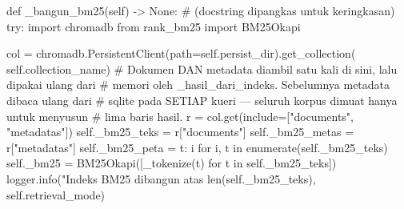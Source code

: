 def _bangun_bm25(self) -> None:
    # (docstring dipangkas untuk keringkasan)
    try:
        import chromadb
        from rank_bm25 import BM25Okapi

        col = chromadb.PersistentClient(path=self.persist_dir).get_collection(
            self.collection_name)
        # Dokumen DAN metadata diambil satu kali di sini, lalu dipakai ulang dari
        # memori oleh _hasil_dari_indeks. Sebelumnya metadata dibaca ulang dari
        # sqlite pada SETIAP kueri — seluruh korpus dimuat hanya untuk menyusun
        # lima baris hasil.
        r = col.get(include=["documents", "metadatas"])
        self._bm25_teks = r["documents"]
        self._bm25_metas = r["metadatas"]
        self._bm25_peta = {t: i for i, t in enumerate(self._bm25_teks)}
        self._bm25 = BM25Okapi([_tokenize(t) for t in self._bm25_teks])
        logger.info("Indeks BM25 dibangun atas %
                    len(self._bm25_teks), self.retrieval_mode)
